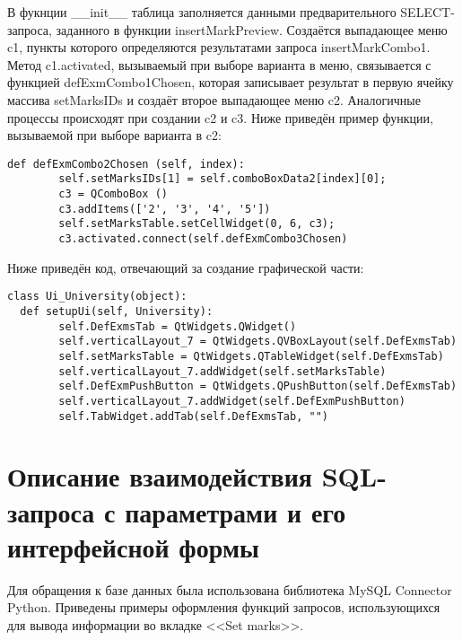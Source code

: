 \documentclass[zuevDbReport.tex]{subfiles}
\begin{document}
В фукнции \_\_init\_\_ таблица заполняется данными предварительного SELECT- запроса, заданного в функции insertMarkPreview. Создаётся выпадающее меню c1, пункты которого определяются результатами запроса insertMarkCombo1. Метод c1.activated, вызываемый при выборе варианта в меню, связывается с функцией defExmCombo1Chosen, которая записывает результат в первую ячейку массива setMarksIDs и создаёт второе выпадающее меню c2. Аналогичные процессы происходят при создании c2 и c3. Ниже приведён пример функции, вызываемой при выборе варианта в c2:\\
\begin{lstlisting}
def defExmCombo2Chosen (self, index):
        self.setMarksIDs[1] = self.comboBoxData2[index][0];
        c3 = QComboBox ()
        c3.addItems(['2', '3', '4', '5'])
        self.setMarksTable.setCellWidget(0, 6, c3);
        c3.activated.connect(self.defExmCombo3Chosen)
\end{lstlisting}
Ниже приведён код, отвечающий за создание графической части:
\begin{lstlisting}
class Ui_University(object):
  def setupUi(self, University):
        self.DefExmsTab = QtWidgets.QWidget()
        self.verticalLayout_7 = QtWidgets.QVBoxLayout(self.DefExmsTab)
        self.setMarksTable = QtWidgets.QTableWidget(self.DefExmsTab)
        self.verticalLayout_7.addWidget(self.setMarksTable)
        self.DefExmPushButton = QtWidgets.QPushButton(self.DefExmsTab)
        self.verticalLayout_7.addWidget(self.DefExmPushButton)
        self.TabWidget.addTab(self.DefExmsTab, "")
\end{lstlisting}

\newpage
\section{Описание взаимодействия SQL-запроса с параметрами и его интерфейсной формы}
Для обращения к базе данных была использована библиотека MySQL Connector Python. Приведены примеры оформления функций запросов, использующихся для вывода информации во вкладке <<Set marks>>.
\end{document}
